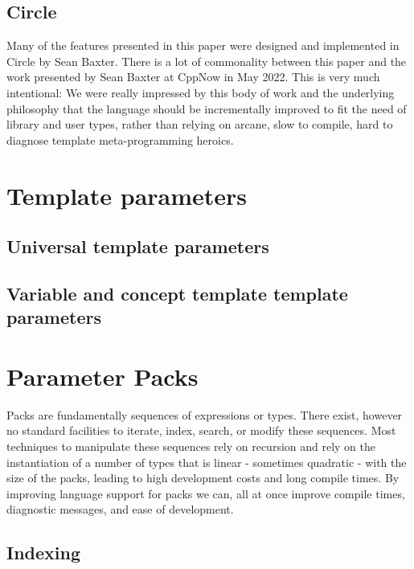 \documentclass{wg21}
\begin{document}
\subsection{Circle}

Many of the features presented in this paper were designed and implemented in Circle by Sean Baxter.
There is a lot of commonality between this paper and the work presented by Sean Baxter at CppNow in May 2022.
This is very much intentional: We were really impressed by this body of work and the underlying philosophy that the language should be incrementally improved
to fit the need of library and user types, rather than relying on arcane, slow to compile, hard to diagnose template meta-programming heroics.


\section{Template parameters}

\subsection{Universal template parameters}


\subsection{Variable and concept template template parameters}


\section{Parameter Packs}

Packs are fundamentally sequences of expressions or types.
There exist, however no standard facilities to iterate, index, search, or modify these sequences.
Most techniques to manipulate these sequences rely on recursion and rely on the instantiation of a number of types that is linear - sometimes quadratic - with the size of the packs, leading to high development costs and long compile times.
By improving language support for packs we can, all at once improve compile times, diagnostic messages, and ease of development.

\subsection{Indexing}
\end{document}
